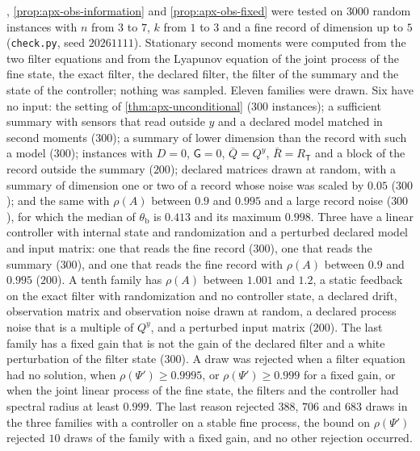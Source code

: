 \begin{numcheck}\label{chk:apx-obs}
, \cref{prop:apx-obs-information} and \cref{prop:apx-obs-fixed} were tested on $3000$ random instances with $n$ from $3$ to $7$, $k$ from $1$ to $3$ and a fine record of dimension up to $5$ (\texttt{check.py}, seed $20261111$). Stationary second moments were computed from the two filter equations and from the Lyapunov equation of the joint process of the fine state, the exact filter, the declared filter, the filter of the summary and the state of the controller; nothing was sampled. Eleven families were drawn. Six have no input: the setting of \cref{thm:apx-unconditional} ($300$ instances); a sufficient summary with sensors that read outside $y$ and a declared model matched in second moments ($300$); a summary of lower dimension than the record with such a model ($300$); instances with $D=0$, $\mathsf G=0$, $\bar Q=Q^y$, $\bar R=R_{\mathsf T}$ and a block of the record outside the summary ($200$); declared matrices drawn at random, with a summary of dimension one or two of a record whose noise was scaled by $0.05$ ($300$); and the same with $\rho(A)$ between $0.9$ and $0.995$ and a large record noise ($300$), for which the median of $\theta_{\mathrm b}$ is $0.413$ and its maximum $0.998$. Three have a linear controller with internal state and randomization and a perturbed declared model and input matrix: one that reads the fine record ($300$), one that reads the summary ($300$), and one that reads the fine record with $\rho(A)$ between $0.9$ and $0.995$ ($200$). A tenth family has $\rho(A)$ between $1.001$ and $1.2$, a static feedback on the exact filter with randomization and no controller state, a declared drift, observation matrix and observation noise drawn at random, a declared process noise that is a multiple of $Q^y$, and a perturbed input matrix ($200$). The last family has a fixed gain that is not the gain of the declared filter and a white perturbation of the filter state ($300$). A draw was rejected when a filter equation had no solution, when $\rho(\Psi')\ge0.9995$, or $\rho(\Psi')\ge0.999$ for a fixed gain, or when the joint linear process of the fine state, the filters and the controller had spectral radius at least $0.999$. The last reason rejected $388$, $706$ and $683$ draws in the three families with a controller on a stable fine process, the bound on $\rho(\Psi')$ rejected $10$ draws of the family with a fixed gain, and no other rejection occurred.


\end{numcheck}
